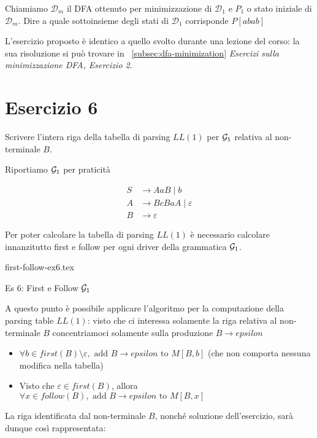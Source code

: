\documentclass[class=book, crop=false, oneside, 12pt]{standalone}
\begin{document}
Chiamiamo \(\mathcal{D}_m\) il  DFA  ottenuto  per  minimizzazione  di \(\mathcal{D}_1\) e \(P_1\) o  stato  iniziale  di \(\mathcal{D}_m\). Dire a quale sottoinsieme degli stati di \(\mathcal{D}_1\) corrisponde \(P[abab]\)

L'esercizio proposto è identico a quello svolto durante una lezione del corso: la sua risoluzione si può trovare in ~\ref{subsec:dfa-minimization} \emph{Esercizi sulla minimizzazione DFA, Esercizio 2}.

\section*{Esercizio 6}

Scrivere l’intera riga della tabella di parsing \(LL(1)\) per \(\mathcal{G}_1\) relativa al non-terminale \(B\).

Riportiamo \(\mathcal{G}_1\) per praticità

\begin{align*}
    S &\to AaB \mid b \\
    A &\to BcBaA \mid \varepsilon \\
    B &\to \varepsilon
\end{align*}

Per poter calcolare la tabella di parsing \(LL(1)\) è necessario calcolare innanzitutto first e follow per ogni driver della grammatica \(\mathcal{G}_1\).

\begin{table}[H]
    \centering
    {first-follow-ex6.tex}
    \caption{Es 6: First e Follow \(\mathcal{G}_1\)}
    \label{tab:first-follow-ex6}
\end{table}

A questo punto è possibile applicare l'algoritmo per la computazione della parsing table \(LL(1)\): visto che ci interessa solamente la riga relativa al non-terminale \(B\) concentriamoci solamente sulla produzione \(B \to epsilon\)

\begin{itemize}
    \item \(\forall b \in first(B) \setminus \varepsilon, \textrm{ add } B \to epsilon \textrm{ to } M[B, b]\) (che non comporta nessuna modifica nella tabella)
    \item Visto che \(\varepsilon \in first(B)\), allora \(\forall x \in follow(B), \textrm{ add } B \to epsilon \textrm{ to } M[B, x]\)
\end{itemize}

La riga identificata dal non-terminale \(B\), nonché soluzione dell'esercizio, sarà dunque così rappresentata:
\end{document}
